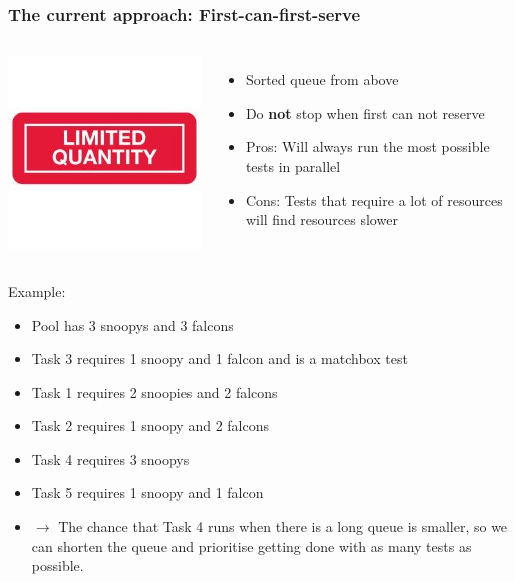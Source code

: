 \documentclass[xcolor=pdftex,dvipsnames,table]{beamer}
\begin{document}
\begin{frame}
\frametitle{The current approach: First-can-first-serve}
\begin{columns}[cc]
\column{0.3in}
\includegraphics[scale=0.20]{limited.jpg}
\column{2.2in}
\begin{itemize}

  \item Sorted queue from above

  \item Do \textbf{not} stop when first can not reserve
  \item Pros: Will always run the most possible tests in parallel
  \item Cons: Tests that require a lot of resources will find
    resources slower
\end{itemize}
\end{columns}
\end{frame}

\begin{frame}
Example:
\begin{itemize}
  \item Pool has 3 snoopys and 3 falcons
  \item Task 3 requires 1 snoopy and 1 falcon and is a matchbox test
  \item Task 1 requires 2 snoopies and 2 falcons
  \item Task 2 requires 1 snoopy and 2 falcons
  \item Task 4 requires 3 snoopys
  \item Task 5 requires 1 snoopy and 1 falcon
  \item $\rightarrow$ The chance that Task 4 runs when there is a long
    queue is smaller, so we can shorten the queue and prioritise
    getting done with as many tests as possible.
\end{itemize}
\end{frame}
\end{document}
